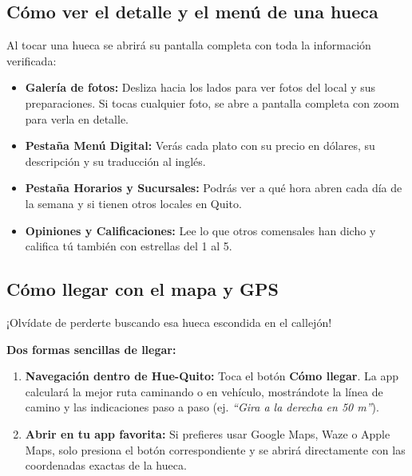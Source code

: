 \documentclass[11pt, a4paper, oneside]{article}
\begin{document}
\subsection{Cómo ver el detalle y el menú de una hueca}
Al tocar una hueca se abrirá su pantalla completa con toda la información verificada:
\begin{itemize}
  \item \textbf{Galería de fotos:} Desliza hacia los lados para ver fotos del local y sus preparaciones. Si tocas cualquier foto, se abre a pantalla completa con zoom para verla en detalle.
  \item \textbf{Pestaña Menú Digital:} Verás cada plato con su precio en dólares, su descripción y su traducción al inglés.
  \item \textbf{Pestaña Horarios y Sucursales:} Podrás ver a qué hora abren cada día de la semana y si tienen otros locales en Quito.
  \item \textbf{Opiniones y Calificaciones:} Lee lo que otros comensales han dicho y califica tú también con estrellas del 1 al 5.
\end{itemize}

\subsection{Cómo llegar con el mapa y GPS}
¡Olvídate de perderte buscando esa hueca escondida en el callejón!
\begin{stepbox}
\textbf{Dos formas sencillas de llegar:}
\begin{enumerate}
  \item \textbf{Navegación dentro de Hue-Quito:} Toca el botón \textbf{Cómo llegar}. La app calculará la mejor ruta caminando o en vehículo, mostrándote la línea de camino y las indicaciones paso a paso (ej. \textit{``Gira a la derecha en 50 m''}).
  \item \textbf{Abrir en tu app favorita:} Si prefieres usar Google Maps, Waze o Apple Maps, solo presiona el botón correspondiente y se abrirá directamente con las coordenadas exactas de la hueca.
\end{enumerate}
\end{stepbox}
\end{document}
